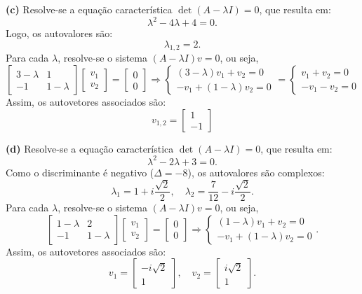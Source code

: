 \begin{resolution}
  {\bf (c)} \;
  Resolve-se a equação característica \( \det(A - \lambda I) = 0 \), que resulta em:
  \[
    \lambda^2-4\lambda+4 = 0.
  \]
  Logo, os autovalores são:
  \[
    \lambda_{1,2} = 2.
  \]
  Para cada \(\lambda\), resolve-se o sistema \((A - \lambda I)v = 0\), ou seja,
  $$
    \begin{bmatrix}
      3 - \lambda & 1 \\ -1 & 1 - \lambda
    \end{bmatrix} \begin{bmatrix}
      v_1 \\ v_2
    \end{bmatrix} = \begin{bmatrix}
      0 \\ 0
    \end{bmatrix} \Rightarrow
    \begin{cases}
      (3 - \lambda) v_1 + v_2 = 0 \\
      -v_1 + (1 - \lambda) v_2 = 0
    \end{cases} = \begin{cases}
      v_1 + v_2 = 0 \\
      -v_1 - v_2 = 0
    \end{cases}
  $$
  Assim, os autovetores associados são:
  \[
    v_{1,2} = \begin{bmatrix} 1 \\ -1\end{bmatrix}
  \]

  {\bf (d)} \;
  Resolve-se a equação característica \( \det(A - \lambda I) = 0 \), que resulta em:
  \[
    \lambda^2 - 2\lambda + 3 = 0.
  \]
  Como o discriminante é negativo (\(\Delta = -8\)), os autovalores são complexos:
  \[
    \lambda_1 = 1 + i\frac{\sqrt{2}}{2}, \quad \lambda_2 = \frac{7}{12} - i\frac{\sqrt{2}}{2}.
  \]
  Para cada \(\lambda\), resolve-se o sistema \((A - \lambda I)v = 0\), ou seja,
  $$
    \begin{bmatrix}
      1 - \lambda & 2 \\ -1 & 1 - \lambda
    \end{bmatrix} \begin{bmatrix}
      v_1 \\ v_2
    \end{bmatrix} = \begin{bmatrix}
      0 \\ 0
    \end{bmatrix} \Rightarrow
    \begin{cases}
      (1 - \lambda) v_1 + v_2 = 0 \\
      -v_1 + (1 - \lambda) v_2 = 0
    \end{cases}.
  $$
  Assim, os autovetores associados são:
  \[
    v_1 = \begin{bmatrix} -i\sqrt{2} \\ 1\end{bmatrix}, \quad
    v_2 = \begin{bmatrix} i \sqrt{2} \\ 1 \end{bmatrix}.
  \]


\end{resolution}
